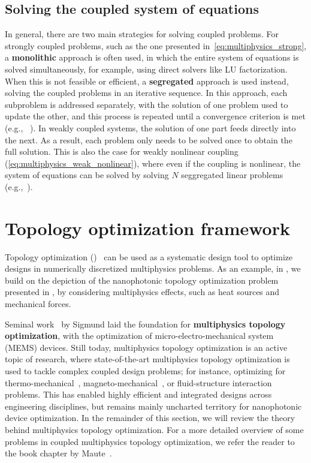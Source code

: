  \subsection*{Solving the coupled system of equations}

 In general, there are two main strategies for solving coupled problems. For strongly coupled problems, 
 such as the one presented in~\eqref{eq:multiphysics_strong}, a \textbf{monolithic} approach is often used, in which the entire system of 
 equations is solved simultaneously, for example, using direct solvers like LU factorization. When this is not feasible or 
 efficient, a \textbf{segregated} approach is used instead, solving the coupled problems in an iterative sequence. In this 
 approach, each subproblem is addressed separately, with the solution of one problem used to update the other, and this process 
 is repeated until a convergence criterion is met (e.g., ~\cite{ownpub5}). In weakly coupled systems, the solution of one part feeds directly into the next. 
 As a result, each problem only needs to be solved once to obtain the full solution. This is also the case for 
 weakly nonlinear coupling (\eqref{eq:multiphysics_weak_nonlinear}), where even if the coupling is nonlinear, the system of equations
 can be solved by solving $N$ seggregated linear problems (e.g.,~\cite{ownpub0}).
    
 \section{Topology optimization framework}\label{sec:topopt_theory}
 Topology optimization ()~\cite{topopt_book} can be used as a systematic design tool to optimize designs in numerically discretized multiphysics problems. 
 As an example, in , we build on the depiction of the nanophotonic topology optimization problem presented in , by considering
 multiphysics effects, such as heat sources and mechanical forces.

 Seminal work~\cite{MEMS_multi} by Sigmund laid the foundation for \textbf{multiphysics topology optimization}, with the optimization of micro-electro-mechanical system (MEMS) devices. 
 Still today, multiphysics topology optimization is an active topic of research, where state-of-the-art multiphysics topology optimization is used to tackle complex coupled design problems; for instance, optimizing for thermo-mechanical~\cite{third_thermal}, magneto-mechanical~\cite{magneto}, or fluid-structure interaction~\cite{fsint} problems. 
 This has enabled highly efficient and integrated designs across engineering disciplines, but remains mainly uncharted territory for nanophotonic device optimization. In the remainder of this section, we will review the theory behind multiphysics topology optimization. For a more detailed overview of some problems in coupled multiphysics
 topology optimization, we refer the reader to the book chapter by Maute~\cite{coupled_topopt}.
    
